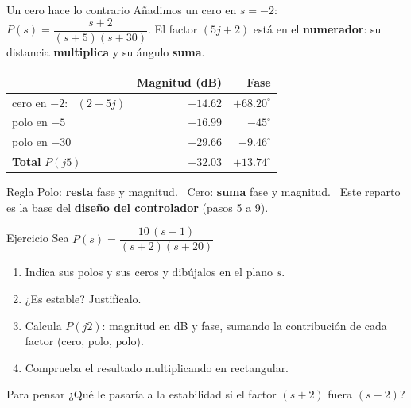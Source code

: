 \documentclass[aspectratio=169,11pt]{beamer}
\begin{document}
\begin{frame}{Un cero hace lo contrario}
  \small
  \setlength{\parskip}{3pt}
  Añadimos un cero en $s=-2$: \quad $P(s)=\dfrac{s+2}{(s+5)(s+30)}$. El factor $(5j+2)$ está en el \textbf{numerador}: su distancia \textbf{multiplica} y su ángulo \textbf{suma}.

  \begin{center}
    \renewcommand{\arraystretch}{1.2}
    \begin{tabular}{lrr}
      \hline
      & \textbf{Magnitud (dB)} & \textbf{Fase} \\
      \hline
      cero en $-2$: \ $(2+5j)$ & $+14.62$ & $+68.20^\circ$ \\
      polo en $-5$ & $-16.99$ & $-45^\circ$ \\
      polo en $-30$ & $-29.66$ & $-9.46^\circ$ \\
      \hline
      \textbf{Total} $P(j5)$ & $\boxed{-32.03}$ & $\boxed{+13.74^\circ}$ \\
      \hline
    \end{tabular}
  \end{center}

  \begin{block}{Regla}
    Polo: \textbf{resta} fase y magnitud. \ Cero: \textbf{suma} fase y magnitud. \ Este reparto es la base del \textbf{diseño del controlador} (pasos 5 a 9).
  \end{block}
\end{frame}

\begin{frame}{Ejercicio}
  Sea \quad $P(s)=\dfrac{10\,(s+1)}{(s+2)(s+20)}$
  \begin{enumerate}
    \item Indica sus polos y sus ceros y dibújalos en el plano $s$.
    \item ¿Es estable? Justifícalo.
    \item Calcula $P(j2)$: magnitud en dB y fase, sumando la contribución de cada factor (cero, polo, polo).
    \item Comprueba el resultado multiplicando en rectangular.
  \end{enumerate}
  \vspace{4pt}
  \begin{block}{Para pensar}
    ¿Qué le pasaría a la estabilidad si el factor $(s+2)$ fuera $(s-2)$?
  \end{block}
\end{frame}
\end{document}

